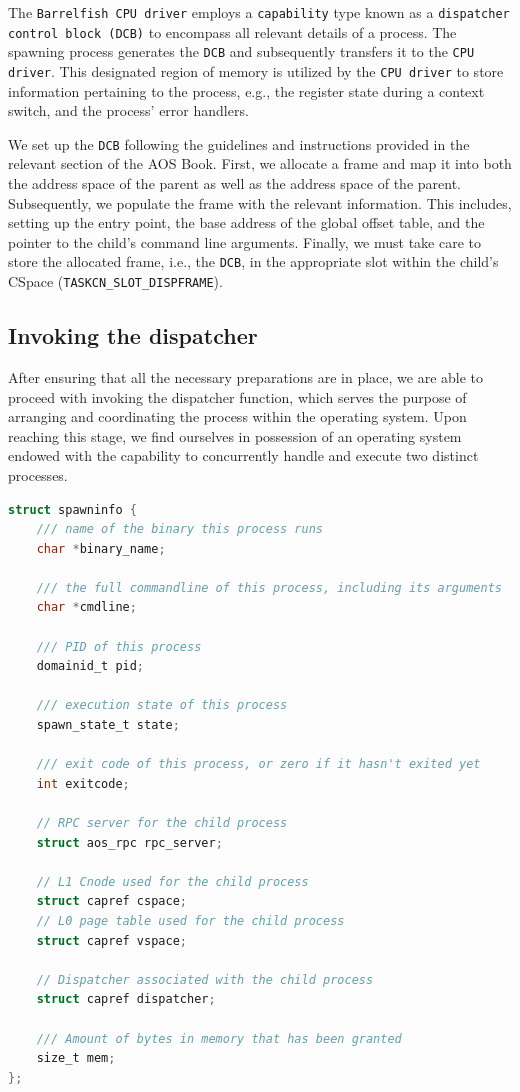 The \texttt{Barrelfish CPU driver} employs a \texttt{capability} type known as a \texttt{dispatcher control block (DCB)} to encompass all relevant details of a process. The spawning process generates the \texttt{DCB} and subsequently transfers it to the \texttt{CPU driver}. This designated region of memory is utilized by the \texttt{CPU driver} to store information pertaining to the process, e.g., the register state during a context switch, and the process' error handlers.

We set up the \texttt{DCB} following the guidelines and instructions provided in the relevant section of the AOS Book. First, we allocate a frame and map it into both the address space of the parent as well as the address space of the parent. Subsequently, we populate the frame with the relevant information. This includes, setting up the entry point, the base address of the global offset table, and the pointer to the child's command line arguments. Finally, we must take care to store the allocated frame, i.e., the \texttt{DCB}, in the appropriate slot within the child's CSpace (\texttt{TASKCN\_SLOT\_DISPFRAME}).

\subsection{Invoking the dispatcher}

After ensuring that all the necessary preparations are in place, we are able to proceed with invoking the dispatcher function, which serves the purpose of arranging and coordinating the process within the operating system. Upon reaching this stage, we find ourselves in possession of an operating system endowed with the capability to concurrently handle and execute two distinct processes.

\begin{lstlisting}[caption={The structure holding a single process},language=C,frame=single,breaklines]
struct spawninfo {
    /// name of the binary this process runs
    char *binary_name;

    /// the full commandline of this process, including its arguments
    char *cmdline;

    /// PID of this process
    domainid_t pid;

    /// execution state of this process
    spawn_state_t state;

    /// exit code of this process, or zero if it hasn't exited yet
    int exitcode;

    // RPC server for the child process
    struct aos_rpc rpc_server;

    // L1 Cnode used for the child process
    struct capref cspace;
    // L0 page table used for the child process
    struct capref vspace;

    // Dispatcher associated with the child process
    struct capref dispatcher;

    /// Amount of bytes in memory that has been granted
    size_t mem;
};
\end{lstlisting}

